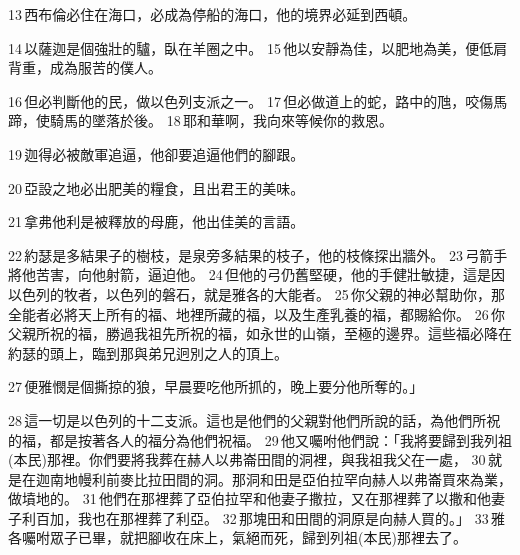 13 西布倫必住在海口，必成為停船的海口，他的境界必延到西頓。

14 以薩迦是個強壯的驢，臥在羊圈之中。 15 他以安靜為佳，以肥地為美，便低肩背重，成為服苦的僕人。

16 但必判斷他的民，做以色列支派之一。 17 但必做道上的蛇，路中的虺，咬傷馬蹄，使騎馬的墜落於後。 18 耶和華啊，我向來等候你的救恩。

19 迦得必被敵軍追逼，他卻要追逼他們的腳跟。

20 亞設之地必出肥美的糧食，且出君王的美味。

21 拿弗他利是被釋放的母鹿，他出佳美的言語。

22 約瑟是多結果子的樹枝，是泉旁多結果的枝子，他的枝條探出牆外。 23 弓箭手將他苦害，向他射箭，逼迫他。 24 但他的弓仍舊堅硬，他的手健壯敏捷，這是因以色列的牧者，以色列的磐石，就是雅各的大能者。 25 你父親的神必幫助你，那全能者必將天上所有的福、地裡所藏的福，以及生產乳養的福，都賜給你。 26 你父親所祝的福，勝過我祖先所祝的福，如永世的山嶺，至極的邊界。這些福必降在約瑟的頭上，臨到那與弟兄迥別之人的頂上。

27 便雅憫是個撕掠的狼，早晨要吃他所抓的，晚上要分他所奪的。」


28 這一切是以色列的十二支派。這也是他們的父親對他們所說的話，為他們所祝的福，都是按著各人的福分為他們祝福。 29 他又囑咐他們說：「我將要歸到我列祖(本民)那裡。你們要將我葬在赫人以弗崙田間的洞裡，與我祖我父在一處， 30 就是在迦南地幔利前麥比拉田間的洞。那洞和田是亞伯拉罕向赫人以弗崙買來為業，做墳地的。 31 他們在那裡葬了亞伯拉罕和他妻子撒拉，又在那裡葬了以撒和他妻子利百加，我也在那裡葬了利亞。 32 那塊田和田間的洞原是向赫人買的。」 33 雅各囑咐眾子已畢，就把腳收在床上，氣絕而死，歸到列祖(本民)那裡去了。


